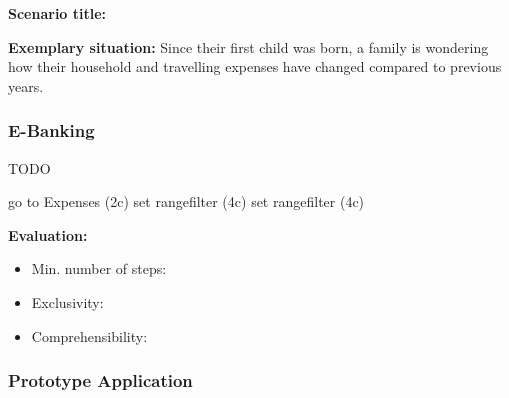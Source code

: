 \textbf{Scenario title:} \scentwo

\textbf{Exemplary situation:} Since their first child was born, a family is wondering how their household and travelling expenses have changed compared to previous years.




\subsubsection{E-Banking}

TODO

go to Expenses (2c)
set rangefilter (4c)
set rangefilter (4c)



\textbf{Evaluation:} 
\begin{itemize}[noitemsep,nolistsep]
	\item Min. number of steps: \textbf{}
	\item Exclusivity: \textbf{}
	\item Comprehensibility: \textbf{}
\end{itemize}



\subsubsection{Prototype Application}

